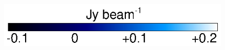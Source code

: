 \documentclass[preprint2]{aastex}
\begin{document}
\begin{figure}[hbt!]
{         }
\end{figure}
\begin{figure}[hbt!]
\mbox{
\includegraphics[trim=0pt 20pt 180pt 10pt]{color_bar.ps}         }
\end{figure}
\end{document}
